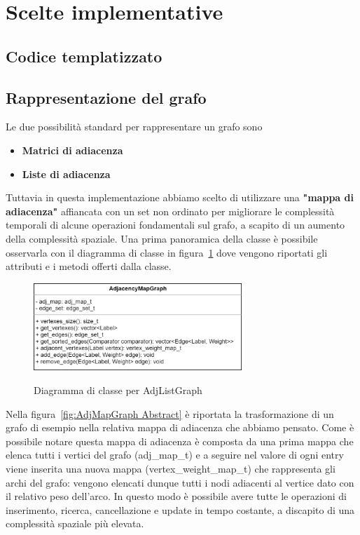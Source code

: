 \section{Scelte implementative}
\label{cap:implementation-choices}

\subsection{Codice templatizzato}

\subsection{Rappresentazione del grafo}

Le due possibilità standard per rappresentare un grafo sono 
\begin{itemize}
	\item \textbf{Matrici di adiacenza}
	\item \textbf{Liste di adiacenza}
\end{itemize}

Tuttavia in questa implementazione abbiamo scelto di utilizzare una \textbf{"mappa di adiacenza"} affiancata con un set non ordinato per migliorare le complessità temporali di alcune operazioni fondamentali sul grafo, a scapito di un aumento della complessità spaziale. Una prima panoramica della classe è possibile osservarla con il diagramma di classe in figura~\ref{fig:AdjMapGraph Class} dove vengono riportati gli attributi e i metodi offerti dalla classe.

\begin{figure}[h]
	\caption{Diagramma di classe per AdjListGraph}
	\centering
	\includegraphics[width=0.7\textwidth]{./images/AdjancencyMapGrapClass.png}
	\label{fig:AdjMapGraph Class}
\end{figure}

Nella figura~\ref{fig:AdjMapGraph Abstract} è riportata la trasformazione di un grafo di esempio nella relativa mappa di adiacenza che abbiamo pensato. Come è possibile notare questa mappa di adiacenza è composta da una prima mappa che elenca tutti i vertici del grafo (adj\_map\_t) e a seguire nel valore di ogni entry viene inserita una nuova mappa (vertex\_weight\_map\_t) che rappresenta gli archi del grafo: vengono elencati dunque tutti i nodi adiacenti al vertice dato con il relativo peso dell'arco. In questo modo è possibile avere tutte le operazioni di inserimento, ricerca, cancellazione e update in tempo costante, a discapito di una complessità spaziale più elevata. 

